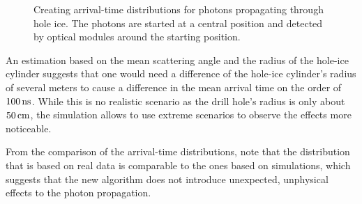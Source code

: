 
\begin{figure}[htbp]
  \hfill
  \caption{Creating arrival-time distributions for photons propagating through hole ice. The photons are started at a central position and detected by optical modules around the starting position.}
  \label{fig:eipau6Ag}
\end{figure}

An estimation based on the mean scattering angle and the radius of the
hole-ice cylinder suggests that one would need a difference of the
hole-ice cylinder's radius of several meters to cause a difference in
the mean arrival time on the order of \(100\text{\,ns}\). While this is no
realistic scenario as the drill hole's radius is only about \(50\text{\,cm}\),
the simulation allows to use extreme scenarios to observe the effects
more noticeable.

From the comparison of the arrival-time distributions, note that the
distribution that is based on real data is comparable to the ones based
on simulations, which suggests that the new algorithm does not introduce
unexpected, unphysical effects to the photon propagation.

